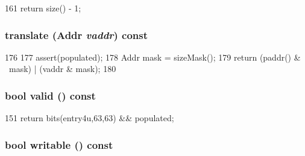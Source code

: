 \begin{DoxyCode}
161 { return size() - 1; }
\end{DoxyCode}
\hypertarget{classSparcISA_1_1PageTableEntry_a2d9d30526f3c6e7e6474010b7f73e590}{
\subsubsection[{translate}]{ translate ({\bf Addr} {\em vaddr}) const}}
\label{classSparcISA_1_1PageTableEntry_a2d9d30526f3c6e7e6474010b7f73e590}



\begin{DoxyCode}
176     {
177         assert(populated);
178         Addr mask = sizeMask();
179         return (paddr() & ~mask) | (vaddr & mask);
180     }
\end{DoxyCode}
\hypertarget{classSparcISA_1_1PageTableEntry_a8d985300b138b6c5556ab17ed4df3b38}{
\subsubsection[{valid}]{\setlength{\rightskip}{0pt plus 5cm}bool valid () const}}
\label{classSparcISA_1_1PageTableEntry_a8d985300b138b6c5556ab17ed4df3b38}



\begin{DoxyCode}
151 { return bits(entry4u,63,63) && populated; }
\end{DoxyCode}
\hypertarget{classSparcISA_1_1PageTableEntry_a3917cec378f7697f74d6600fb0f08878}{
\subsubsection[{writable}]{\setlength{\rightskip}{0pt plus 5cm}bool writable () const}}
\label{classSparcISA_1_1PageTableEntry_a3917cec378f7697f74d6600fb0f08878}



